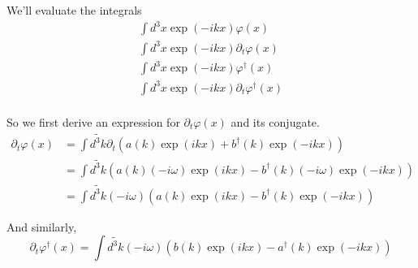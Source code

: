 \documentclass[fontsize=11pt]{scrartcl} %
\numberwithin{equation}{section} %
\numberwithin{figure}{section} %
\numberwithin{table}{section} %
\begin{document}
We'll evaluate the integrals
\[
    \begin{aligned}
        \int d^3x\exp(-ikx)\varphi(x)\\
        \int d^3x\exp(-ikx)\partial_t\varphi(x)\\
        \int d^3x\exp(-ikx)\varphi^{\dagger}(x)\\
        \int d^3x\exp(-ikx)\partial_t\varphi^{\dagger}(x)\\
    \end{aligned}
\]

So we first derive an expression for $\partial_t\varphi(x)$ and its conjugate.
\[
\begin{aligned}
    \partial_t\varphi(x) &= \int \tilde{d^3k}\partial_t\left( a(k)\exp(ikx) +
    b^{\dagger}(k)\exp(-ikx) \right)\\
    &= \int \tilde{d^3k}\left( a(k)(-i\omega)\exp(ikx) -
    b^{\dagger}(k)(-i\omega)\exp(-ikx) \right)\\
    &=\int \tilde{d^3k}(-i\omega)\left( a(k)\exp(ikx) - b^{\dagger}(k)\exp(-ikx) \right)
\end{aligned}
\]

And similarly,
\[
    \partial_t\varphi^{\dagger}(x) = \int \tilde{d^3k}(-i\omega)\left(
        b(k)\exp(ikx) - a^{\dagger}(k)\exp(-ikx)
    \right)
\]
\end{document}
